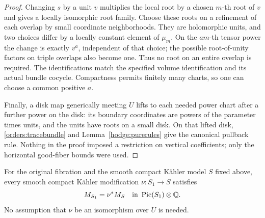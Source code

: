 \begin{proof}
Changing \(s\) by a unit \(v\) multiplies the local root by a chosen
\(m\)-th root of \(v\) and gives a locally isomorphic root
family.  Choose these roots on a refinement of each overlap by
small coordinate neighborhoods.  They are holomorphic units, and
two choices differ by a locally constant element of \(\mu_m\).
On the \(am\)-th tensor power the change is exactly \(v^a\),
independent of that choice; the possible root-of-unity factors on
triple overlaps also become one.  Thus no root on an entire
overlap is required.  The identifications match the specified
volume identification and its actual bundle cocycle.
Compactness permits finitely many
charts, so one can choose a common positive \(a\).

Finally, a disk map generically meeting \(U\) lifts to each
needed power chart after a further power on the disk: its
boundary coordinates are powers of the parameter times units,
and the units have roots on a small disk.  On that lifted disk,
\eqref{orders:tracebundle} and
Lemma~\ref{hodge:purerules} give the canonical pullback rule.
Nothing in the proof imposed a restriction on vertical
coefficients; only the horizontal good-fiber bounds were used.
\end{proof}

\begin{corollary}
\label{orders:bdescent}
For the original fibration and the smooth compact K\"ahler model
\(S\) fixed above, every smooth compact K\"ahler modification
\(\nu:S_1\to S\) satisfies
\[
                         M_{S_1}=\nu^*M_S
                         \quad\text{in }\operatorname{Pic}(S_1)\otimes\mathbb Q.
\]
No assumption that \(\nu\) be an isomorphism over \(U\) is needed.
\end{corollary}

